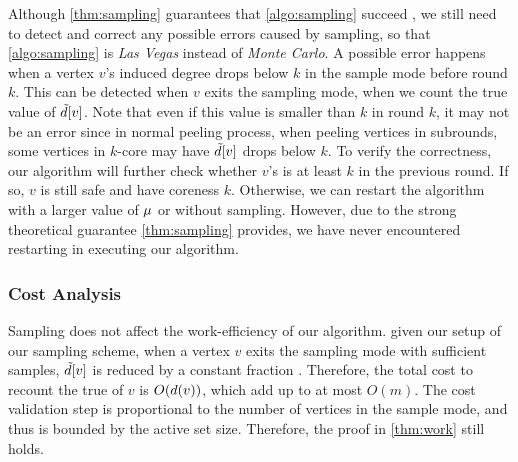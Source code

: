 Although \cref{thm:sampling} guarantees that \cref{algo:sampling} succeed \whp{}, we still need to detect and correct any possible errors caused by sampling, so that \cref{algo:sampling} is \emph{Las Vegas} instead of \emph{Monte Carlo}.
A possible error happens when a vertex $v$'s induced degree drops below $k$ in the sample mode before round $k$.
This can be detected when $v$ exits the sampling mode, when we count the true value of $\tilde{d}[v]$.
Note that even if this value is smaller than $k$ in round $k$, it may not be an error since in normal peeling process, 
when peeling vertices in subrounds, some vertices in $k$-core may have $\tilde{d}[v]$ drops below $k$.
To verify the correctness, our algorithm will further check whether $v$'s \induceddegree{} is at least $k$ in the previous round.
If so, $v$ is still safe and have coreness $k$. 
Otherwise, we can restart the algorithm with a larger value of $\mathit{\mu}$ or without sampling. 
However, due to the strong theoretical guarantee \cref{thm:sampling} provides, 
we have never encountered restarting in executing our \kcore algorithm. 

\subsubsection{Cost Analysis}\label{sec:sampling:contention}
Sampling does not affect the work-efficiency of our algorithm. %
given our setup of our sampling scheme, when a vertex $v$ exits the sampling mode with sufficient samples, $\tilde{d}[v]$ is reduced by a constant fraction \whp{}.
Therefore, the total cost to recount the true \induceddegree{} of $v$ is $O(d(v))$, which add up to at most $O(m)$. 
The cost validation step is proportional to the number of vertices in the sample mode, and thus is bounded by the active set size. Therefore, the proof in \cref{thm:work} still holds. 

